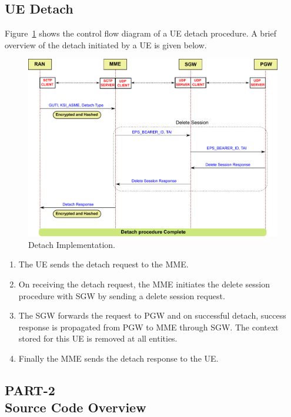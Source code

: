 \documentclass[hidelinks]{report}
\begin{document}
\subsection*{UE Detach}

Figure~\ref{nfv_detach} shows the control flow diagram of a UE detach procedure. A brief overview of the detach initiated by a UE is given below.

\begin{figure}[h]

\centering
\includegraphics[scale=0.5]{nfv_detach}
\caption{Detach Implementation.}
\label{nfv_detach}

\end{figure}

\begin{enumerate}

\item The UE sends the detach request to the MME.

\item On receiving the detach request, the MME  initiates the delete session procedure with SGW by sending a delete session request.

\item The SGW forwards the request to PGW and on successful detach, success response is propagated from PGW to MME through SGW. The context stored for this UE is removed at all entities.

\item Finally the MME sends the detach response to the UE.

\end{enumerate}

\begin{center}

\subsection*{PART-2 \\ Source Code Overview}

\end{center}
\end{document}
